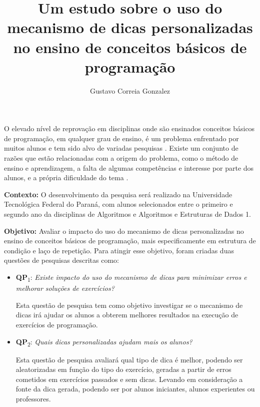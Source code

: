 \documentclass[12pt,english,brazil,a4paper,utf8,oneside]{utfpr-tcc}
\author{Gustavo Correia Gonzalez}  %
\title{Um estudo sobre o uso do mecanismo de dicas personalizadas no ensino de conceitos básicos de programação} %
\begin{document}
	
\frontmatter
\maketitle

\begin{resumo}

O elevado nível de reprovação em disciplinas onde são ensinados conceitos básicos de programação, em qualquer grau de ensino, é um problema enfrentado por muitos alunos e tem sido alvo de variadas pesquisas \cite{Holcomb:2016:RCA:2839509.2851062}. Existe um conjunto de razões que estão relacionadas com a origem do problema, como o método de ensino e aprendizagem, a falta de algumas competências e interesse por parte dos alunos, e a própria dificuldade do tema \cite{Sinclair:2015:MSE:2729094.2742586}.

\textbf{Contexto:} O desenvolvimento da pesquisa será realizado na Universidade Tecnológica Federal do Paraná, com alunos selecionados entre o primeiro e segundo ano da disciplinas de Algoritmos e Algoritmos e Estruturas de Dados 1.

\textbf{Objetivo:} Avaliar o impacto do uso do mecanismo de dicas personalizadas no ensino de conceitos básicos de programação, mais especificamente em estrutura de condição e laço de repetição. Para atingir esse objetivo, foram criadas duas questões de pesquisas descritas como:

\begin{itemize}
	\item \textbf{QP}\textsubscript{1}: 
	\textit{Existe impacto do uso do mecanismo de dicas para minimizar erros e melhorar soluções de exercícios?}
	
	Esta questão de pesquisa tem como objetivo investigar se o mecanismo de dicas irá ajudar os alunos a obterem melhores resultados na execução de exercícios de programação. 
	
	\item \textbf{QP}\textsubscript{2}: 
	\textit{Quais dicas personalizadas ajudam mais os alunos?}
	
	Esta questão de pesquisa avaliará qual tipo de dica é melhor, podendo ser aleatorizadas em função do tipo do exercício, geradas a partir de erros cometidos em exercícios passados e sem dicas. Levando em consideração a fonte da dica gerada, podendo ser por alunos iniciantes, alunos experientes ou professores.
	

\end{itemize}
\end{resumo}
\end{document}
